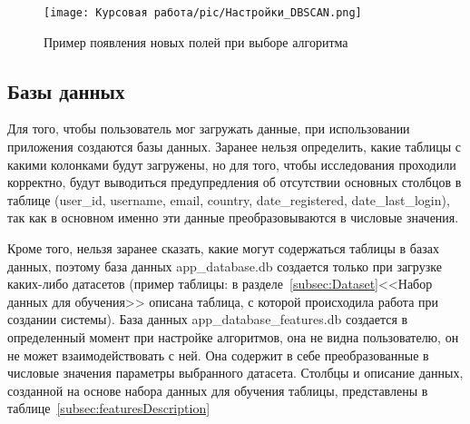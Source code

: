 \begin{figure}[H]
    \texttt{[image: Курсовая работа/pic/Настройки\_DBSCAN.png]}
    \caption{Пример появления новых полей при выборе алгоритма}
    \label{ris:Settings01}
\end{figure}

\vspace{1.5em}
\subsection{Базы данных}
\label{subsec:Graphic}

Для того, чтобы пользователь мог загружать данные, при использовании приложения создаются базы данных. Заранее нельзя определить, какие таблицы с какими колонками будут загружены, но для того, чтобы исследования проходили корректно, будут выводиться предупредления об отсутствии основных столбцов в таблице (user\_id, username, email, country, date\_registered, date\_last\_login), так как в основном именно эти данные преобразовываются в числовые значения. 

Кроме того, нельзя заранее сказать, какие могут содержаться таблицы в базах данных, поэтому база данных app\_database.db создается только при загрузке каких-либо датасетов (пример таблицы: в разделе~\ref{subsec:Dataset}<<Набор данных для обучения>> описана таблица, с которой происходила работа при создании системы). 
База данных app\_database\_features.db создается в определенный момент при настройке алгоритмов, она не видна пользователю, он не может взаимодействовать с ней. Она содержит в себе преобразованные в числовые значения параметры выбранного датасета. Столбцы и описание данных, созданной на основе набора данных для обучения таблицы, представлены в таблице~\ref{subsec:featuresDescription} 

